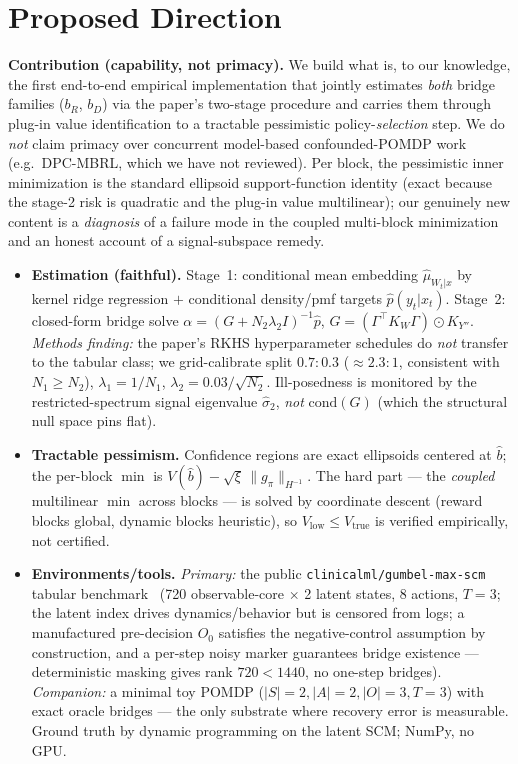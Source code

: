 \documentclass[10pt]{article}
\begin{document}
\section{Proposed Direction}

\noindent\textbf{Contribution (capability, not primacy).} We build what is, to our knowledge, the first
end-to-end empirical implementation that jointly estimates \emph{both} bridge families ($b_R$, $b_D$) via the
paper's two-stage procedure and carries them through plug-in value identification to a tractable pessimistic
policy-\emph{selection} step. We do \emph{not} claim primacy over concurrent model-based confounded-POMDP work
(e.g.\ DPC-MBRL, which we have not reviewed). Per block, the pessimistic inner minimization is the standard
ellipsoid support-function identity (exact because the stage-2 risk is quadratic and the plug-in value
multilinear); our genuinely new content is a \emph{diagnosis} of a failure mode in the coupled multi-block
minimization and an honest account of a signal-subspace remedy.

\begin{itemize}
  \item \textbf{Estimation (faithful).} Stage~1: conditional mean embedding $\hat\mu_{W_t|x}$ by kernel ridge
  regression $+$ conditional density/pmf targets $\hat p(y_t|x_t)$. Stage~2: closed-form bridge solve
  $\alpha = (G + N_2\lambda_2 I)^{-1}\hat p$, $G = (\Gamma^\top K_W \Gamma) \odot K_{Y''}$. \emph{Methods
  finding:} the paper's RKHS hyperparameter schedules do \emph{not} transfer to the tabular class; we
  grid-calibrate split $0.7{:}0.3$ ($\approx 2.3{:}1$, consistent with $N_1 \ge N_2$), $\lambda_1 = 1/N_1$,
  $\lambda_2 = 0.03/\sqrt{N_2}$. Ill-posedness is monitored by the restricted-spectrum signal eigenvalue
  $\hat\sigma_2$, \emph{not} $\mathrm{cond}(G)$ (which the structural null space pins flat).
  \item \textbf{Tractable pessimism.} Confidence regions are exact ellipsoids centered at $\hat b$; the
  per-block $\min$ is $V(\hat b) - \sqrt{\xi}\,\|g_\pi\|_{H^{-1}}$. The hard part --- the \emph{coupled}
  multilinear $\min$ across blocks --- is solved by coordinate descent (reward blocks global, dynamic blocks
  heuristic), so $V_{\mathrm{low}} \le V_{\mathrm{true}}$ is verified empirically, not certified.
  \item \textbf{Environments/tools.} \emph{Primary:} the public \texttt{clinicalml/gumbel-max-scm} tabular
  benchmark~\cite{oberst2019} (720 observable-core $\times$ 2 latent states, 8 actions, $T{=}3$; the latent
  index drives dynamics/behavior but is censored from logs; a manufactured pre-decision $O_0$ satisfies the
  negative-control assumption by construction, and a per-step noisy marker guarantees bridge existence ---
  deterministic masking gives rank $720<1440$, no one-step bridges). \emph{Companion:} a minimal toy POMDP
  ($|S|{=}2,|A|{=}2,|O|{=}3,T{=}3$) with exact oracle bridges --- the only substrate where recovery error is
  measurable. Ground truth by dynamic programming on the latent SCM; NumPy, no GPU.
\end{itemize}
\end{document}
